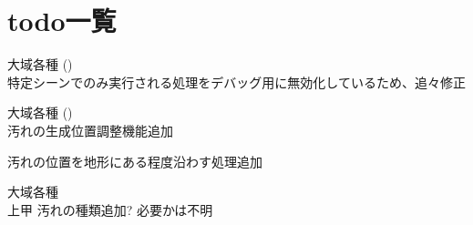 \chapter{todo一覧}
\hypertarget{todo}{}\label{todo}

\begin{DoxyRefList}
\item[大域各種 \doxylink{class_character_core_1_1_action_state___idle_and_move_afc98991d89353c5d6d57254bdf26bda6}{Character\+Core.Action\+State\+\_\+\+Idle\+And\+Move.Management\+Scene\+Player\+Update} ()]\hfill \\
\label{todo__todo000001}%
%
特定シーンでのみ実行される処理をデバッグ用に無効化しているため、追々修正  
\item[大域各種 \doxylink{class_generate_cleaning_event_adbafe1be8e899f0d007b4c2d401b040b}{Generate\+Cleaning\+Event.Create\+Dirt} ()]\hfill \\
\label{todo__todo000003}%
%
汚れの生成位置調整機能追加 



汚れの位置を地形にある程度沿わす処理追加  
\item[大域各種 \doxylink{class_generate_cleaning_event_a6e7263bd0daba49bbe3b0b3bdddae70d}{Generate\+Cleaning\+Event.m\+\_\+dirt\+Prefab} ]\hfill \\
\label{todo__todo000002}%
%
上甲 汚れの種類追加? 必要かは不明 
\end{DoxyRefList}